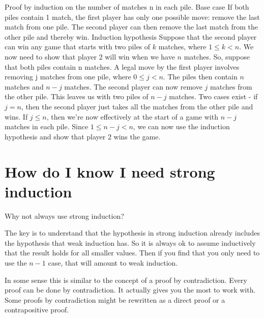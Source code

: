 \documentclass[12pt]{article}
\begin{document}
Proof by induction on the number of matches n in each pile.
Base case If both piles contain 1 match, the first player has only one possible move:
remove the last match from one pile. The second player can then remove the last
match from the other pile and thereby win.
Induction hypothesis Suppose that the second player can win any game that starts
with two piles of $k$ matches, where $1\le k < n$. We now need to show that player 2
will win when we have $n$ matches. So, suppose that both piles contain n matches.
A legal move by the first player involves removing j matches from one pile, where
$0 \le j< n$. The piles then contain $n$ matches and $n - j$ matches. The second player
can now remove $j$ matches from the other pile. This leaves us with two piles of $n - j$
matches. Two cases exist - if $j = n$, then the second player just takes all the matches
from the other pile and wins. If $j \le n$, then we’re now effectively at the start of a game
with $n - j$ matches in each pile. Since $1 \le  n-j < n$, we can now use the induction
hypothesis and show that player 2 wins the game.


\section*{How do I know I need strong induction}
Why not always use strong induction? 

The key is to understand that the hypothesis in strong induction already includes the hypothesis that weak induction has. So it is always ok to assume inductively that the result holds for all smaller values. Then if you find that you only need to use the $n-1$ case, that will amount to weak induction. 

In some sense this is similar to the concept of a proof by contradiction. Every proof can be done by contradiction. It actually gives you the most to work with. Some proofs by contradiction might be rewritten as a direct proof or a contrapositive proof. 
\end{document}
